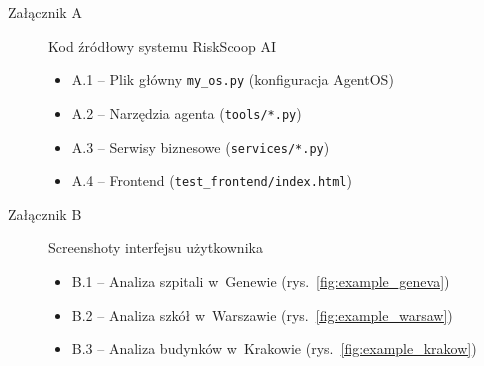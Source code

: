 \begin{description}
    \item[Załącznik A] Kod źródłowy systemu RiskScoop AI
    \begin{itemize}
        \item A.1 -- Plik główny \texttt{my\_os.py} (konfiguracja AgentOS)
        \item A.2 -- Narzędzia agenta (\texttt{tools/*.py})
        \item A.3 -- Serwisy biznesowe (\texttt{services/*.py})
        \item A.4 -- Frontend (\texttt{test\_frontend/index.html})
    \end{itemize}

    \item[Załącznik B] Screenshoty interfejsu użytkownika
    \begin{itemize}
        \item B.1 -- Analiza szpitali w~Genewie (rys.~\ref{fig:example_geneva})
        \item B.2 -- Analiza szkół w~Warszawie (rys.~\ref{fig:example_warsaw})
        \item B.3 -- Analiza budynków w~Krakowie (rys.~\ref{fig:example_krakow})
    \end{itemize}
\end{description}

